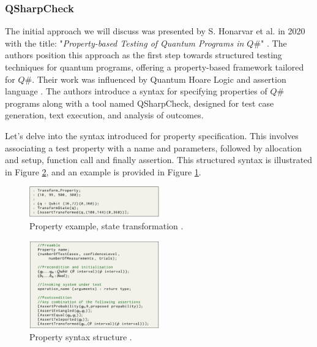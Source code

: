 \begin{itemize}
\vspace{10pt}
\subsubsection{QSharpCheck}
\label{Ch2.3.2:QSharpCheck}
The initial approach we will discuss was presented by S. Honarvar et al. in 2020 with the title: "\textit{Property-based Testing of Quantum Programs in $Q\#$}" \cite{honarvar2020property}. The authors position this approach as the first step towards structured testing techniques for quantum programs, offering a property-based framework tailored for $Q\#$. Their work was influenced by Quantum Hoare Logic \cite{ying2012floyd} and assertion language \cite{huang2019statistical}. The authors introduce a syntax for specifying properties of $Q\#$ programs along with a tool named QSharpCheck, designed for test case generation, text execution, and analysis of outcomes.\newline

Let's delve into the syntax introduced for property specification. This involves associating a test property with a name and parameters, followed by allocation and setup, function call and finally assertion. This structured syntax is illustrated in Figure \ref{Fig:QSharpSyntax}, and an example is provided in Figure \ref{Fig:QSharpSyntaxEx}.

\vspace{15pt}

\begin{figure}[H]
        \centering
        \includegraphics[width=0.5\textwidth]{TFM/photos/QsharpSyntaxEx.png}
        \caption{Property example, state transformation \cite{honarvar2020property}.} 
        \label{Fig:QSharpSyntaxEx}
\end{figure}

\begin{figure}[H]
        \centering
        \includegraphics[width=0.5\textwidth]{TFM/photos/QsharpSyntax.png}
        \caption{Property syntax structure \cite{honarvar2020property}.} 
        \label{Fig:QSharpSyntax}
\end{figure}



\end{itemize}

